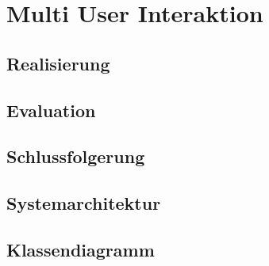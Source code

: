 \chapter{Multi User Interaktion}
\label{ch:Multi_User_Interaktion}

\section{Realisierung}

\section{Evaluation}

\section{Schlussfolgerung}

\section{Systemarchitektur}

\section{Klassendiagramm}